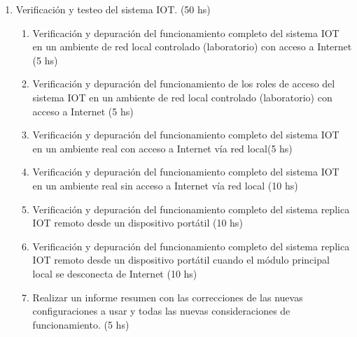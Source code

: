 \documentclass[11pt]{charter}
\begin{document}
\begin{enumerate}
\begin{enumerate}
	\end{enumerate}
\item Verificación y testeo del sistema IOT. (50 hs)
	\begin{enumerate}
	\item Verificación y depuración del funcionamiento completo del sistema IOT en un ambiente de red local controlado (laboratorio) con acceso a Internet (5 hs)
	\item Verificación y depuración del funcionamiento de los roles de acceso del sistema IOT en un ambiente de red local controlado (laboratorio) con acceso a Internet (5 hs) 
	\item Verificación y depuración del funcionamiento completo del sistema IOT en un ambiente real con acceso a Internet vía red local(5 hs) 
	\item Verificación y depuración del funcionamiento completo del sistema IOT en un ambiente real sin acceso a Internet vía red local (10 hs) 
	\item Verificación y depuración del funcionamiento completo del sistema replica IOT remoto desde un dispositivo portátil (10 hs)
	\item Verificación y depuración del funcionamiento completo del sistema replica IOT remoto desde un dispositivo portátil cuando el módulo principal local se desconecta de Internet (10 hs)
	\item Realizar un informe resumen con las correcciones de las nuevas configuraciones a usar y todas las nuevas consideraciones de funcionamiento. (5 hs)
	\end{enumerate}
		
		
\end{enumerate}
\end{document}

